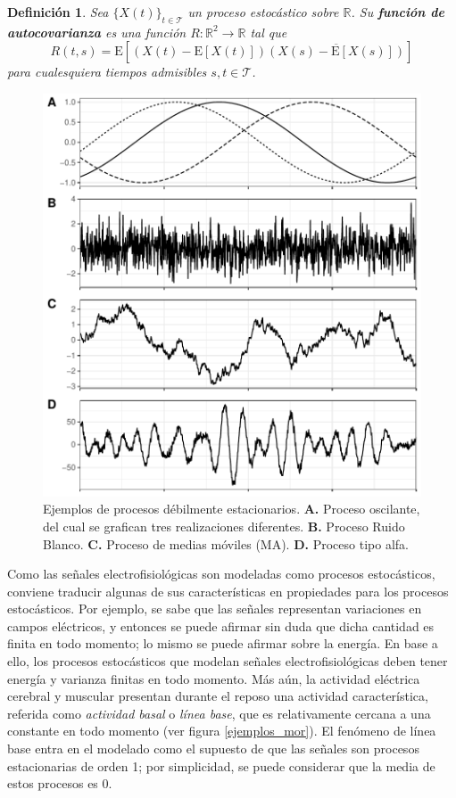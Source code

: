 \documentclass[12pt,letterpaper]{book}
\newtheorem{definicion}{Definición}[chapter]
\newcommand{\R}{\mathbb{R}}
\newcommand{\E}[1]{\mathrm{E}\left[ #1 \right]}
\newcommand{\xt}{$\{X(t)\}_{t\in \mathcal{T}}$ }
\begin{document}
\begin{definicion}
Sea \xt un proceso estocástico sobre $\R$. Su \textbf{función de autocovarianza} es una función $R: \R^{2}\rightarrow \R$ tal que
\begin{equation}
R(t,s) = \E{\left(X(t) - \E{X(t)}\right)\overline{\left(X(s) - \E{X(s)}\right)}}
\end{equation} 
para cualesquiera tiempos admisibles $s, t \in \mathcal{T}$.
\end{definicion}

\begin{figure}
\centering
\includegraphics[width=\linewidth]{./img_mas_ejemplos/ruidos_ejemplos.pdf}
\caption[Ejemplos de procesos débilmente estacionarios]{Ejemplos de procesos débilmente estacionarios. \textbf{A.} Proceso oscilante, del cual se grafican tres realizaciones diferentes. \textbf{B.} Proceso Ruido Blanco. \textbf{C.} Proceso de medias móviles (MA). \textbf{D.} Proceso tipo alfa. }
\end{figure}

Como las señales electrofisiológicas son modeladas como procesos estocásticos, conviene traducir algunas de sus características en propiedades para los procesos estocásticos.
%
Por ejemplo, se sabe que las señales representan variaciones en campos eléctricos, y entonces se puede afirmar sin duda que dicha cantidad es finita en todo momento; lo mismo se puede afirmar sobre la energía.
%
En base a ello, los procesos estocásticos que modelan señales electrofisiológicas deben tener energía y varianza finitas en todo momento.
%
Más aún, la actividad eléctrica cerebral y muscular presentan durante el reposo una actividad característica, referida como \textit{actividad basal} o \textit{línea base}, que es relativamente cercana a una constante en todo momento (ver figura \ref{ejemplos_mor}).
%
El fenómeno de línea base entra en el modelado como el supuesto de que las señales son procesos estacionarias de orden 1; por simplicidad, se puede considerar que la media de estos procesos es 0.
\end{document}
